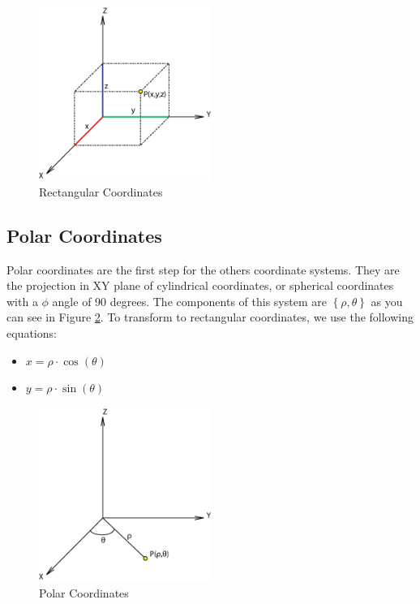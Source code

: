 \documentclass[12pt,a4paper,oneside,english]{book}
\begin{document}
\begin{figure}[htbp]
  \begin{center}
    \includegraphics[width=0.50\textwidth]{images/RC.png}
    \caption{Rectangular Coordinates}
    \label{rectangular coordinates}
  \end{center}
\end{figure}

\newpage

\subsection{Polar Coordinates}

Polar coordinates are the first step for the others coordinate systems. They are the projection in XY plane of cylindrical coordinates, or spherical coordinates with a $\phi$ angle of 90 degrees. The components of this system are $\left\{\rho,\theta\right\}$ as you can see in Figure \ref{polar coordinates}. To transform to rectangular coordinates, we use the following equations:

\begin{itemize}
  \item $x=\rho\cdot\cos(\theta)$
  \item $y=\rho\cdot\sin(\theta)$
\end{itemize}

\begin{figure}[htbp]
  \begin{center}
    \includegraphics[width=0.50\textwidth]{images/PC.png}
    \caption{Polar Coordinates}
    \label{polar coordinates}
  \end{center}
\end{figure}
\end{document}
